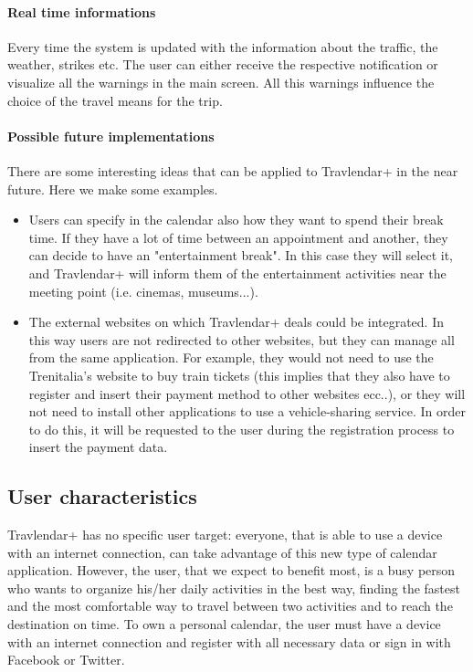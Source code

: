 \documentclass[12pt,titlepage]{article}
\begin{document}
\paragraph{Real time informations}
Every time the system is updated with the information about the traffic, the weather, strikes etc. The user can either receive the respective notification or visualize all the warnings in the main screen. All this warnings influence the choice of the travel means for the trip. 


\paragraph{Possible future implementations} 
There are some interesting ideas that can be applied to Travlendar+ in the near future. Here we make some examples.
\begin{itemize}
\item Users can specify in the calendar also how they want to spend their break time. If they have a lot of time between an appointment and another, they can decide to have an "entertainment break". In this case they will select it, and Travlendar+ will inform them of the entertainment activities near the meeting point (i.e. cinemas, museums...).
\item The external websites on which Travlendar+ deals could be integrated. In this way users are not redirected to other websites, but they can manage all from the same application. For example, they would not need to use the Trenitalia's website to buy train tickets (this implies that they also have to register and insert their payment method to other websites ecc..), or they will not need to install other applications to use a vehicle-sharing service.  In order to do this, it will be requested to the user during the registration process to insert the payment data. 
\end{itemize}

\subsection{User characteristics}\label{sec:mod1}
Travlendar+ has no specific user target: everyone, that is able to use a device with an internet connection, can take advantage of this new type of calendar application.
However, the user, that we expect to benefit most, is a busy person who wants to organize his/her daily activities in the best way, finding the fastest and the most comfortable way to travel between two activities and to reach the destination on time.
To own a personal calendar, the user must have a device with an internet connection and register with all necessary data or sign in with Facebook or Twitter.
\end{document}
